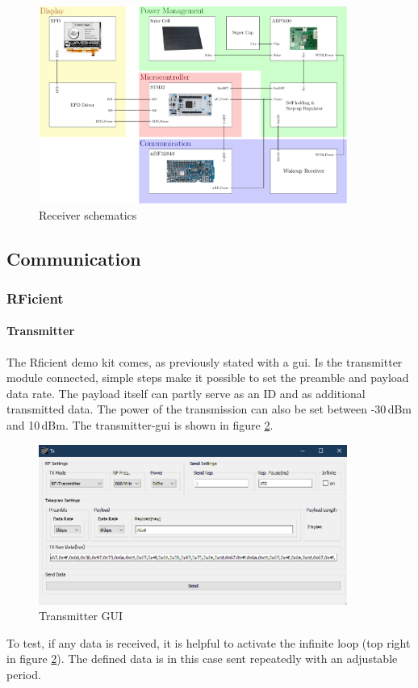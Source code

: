 \begin{figure}[ht]
	\centering
	\includegraphics[width=0.9\textwidth]{4-development/hardware/graphics/top/top_schematics.pdf}
	\caption{Receiver schematics\label{hardware:block}}
\end{figure}

\subsection{Communication}

\subsubsection{RFicient}

\paragraph{Transmitter}
The Rficient demo kit comes, as previously stated with a \acs{gui}.
Is the transmitter module connected, simple steps make it possible to set the preamble and payload data rate. 
The payload itself can partly serve as an ID and as additional transmitted data.
The power of the transmission can also be set between -30\,dBm and 10\,dBm.
The transmitter-\acs{gui} is shown in figure \ref{development:tx}.
\begin{figure}[ht]
	\centering
	\includegraphics[width=0.9\textwidth]{4-development/hardware/graphics/TXgui.png}
	\caption{Transmitter GUI\label{development:tx}}
\end{figure}
To test, if any data is received, it is helpful to activate the infinite loop (top right in figure \ref{development:tx}).
The defined data is in this case sent repeatedly with an adjustable period.

